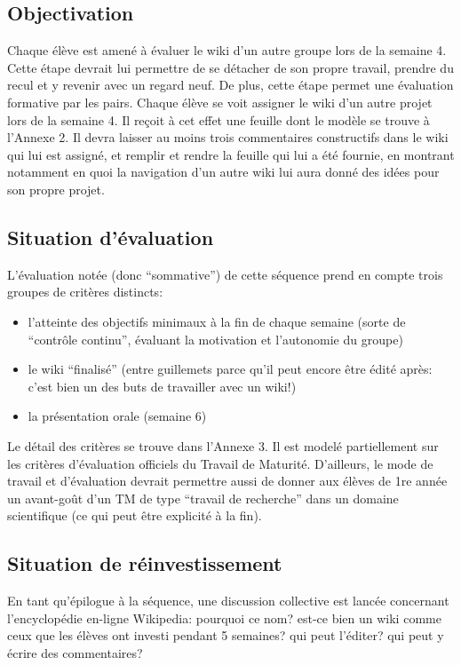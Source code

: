 \documentclass[11pt,bibliography=totoc]{scrartcl}
\begin{document}
\subsection{Objectivation}
Chaque élève est amené à évaluer le wiki d'un autre groupe lors de la semaine
4. Cette étape devrait lui permettre de se détacher de son propre travail,
prendre du recul et y revenir avec un regard neuf. De plus, cette étape permet
une évaluation formative par les pairs. Chaque élève se voit assigner le wiki
d'un autre projet lors de la semaine 4. Il reçoit à cet effet une feuille dont
le modèle se trouve à l'Annexe 2. Il devra laisser au moins trois commentaires
constructifs dans le wiki qui lui est assigné, et remplir et rendre la feuille
qui lui a été fournie, en montrant notamment en quoi la navigation d'un autre
wiki lui aura donné des idées pour son propre projet.

\subsection{Situation d'évaluation}
L'évaluation notée (donc ``sommative'') de cette séquence prend en compte trois
groupes de critères distincts:
\begin{itemize}
\item l'atteinte des objectifs minimaux à la fin de chaque semaine (sorte de
  ``contrôle continu'', évaluant la motivation et l'autonomie du groupe)
\item le wiki ``finalisé'' (entre guillemets parce qu'il peut encore être édité
  après: c'est bien un des buts de travailler avec un wiki!)
\item la présentation orale (semaine 6)
\end{itemize}
Le détail des critères se trouve dans l'Annexe 3. Il est modelé partiellement
sur les critères d'évaluation officiels du Travail de Maturité. D'ailleurs, le
mode de travail et d'évaluation devrait permettre aussi de donner aux élèves de
1re année un avant-goût d'un TM de type ``travail de recherche'' dans un domaine
scientifique (ce qui peut être explicité à la fin).

\subsection{Situation de réinvestissement}
En tant qu'épilogue à la séquence, une discussion collective est lancée
concernant l'encyclopédie en-ligne Wikipedia: pourquoi ce nom? est-ce bien un
wiki comme ceux que les élèves ont investi pendant 5 semaines? qui peut
l'éditer? qui peut y écrire des commentaires?
\end{document}
